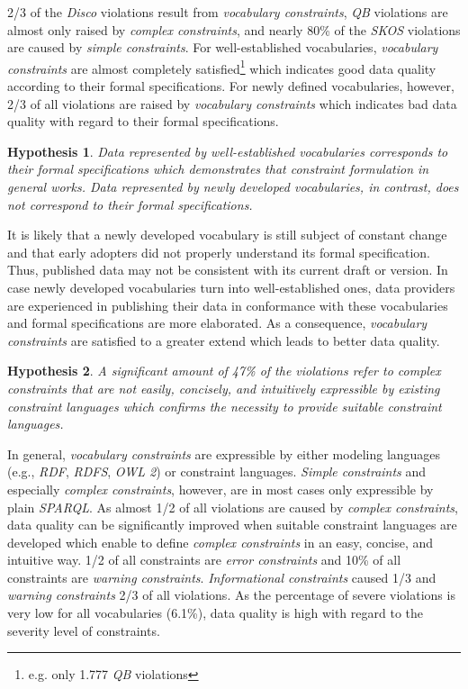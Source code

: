 \documentclass{llncs}
\newcommand{\tb}[1]{\todo[size=\small, color=green!40]{\textbf{Thomas:} #1}}
\newtheorem{hyp}{Hypothesis}
\begin{document}
2/3 of the \emph{Disco} violations result from \emph{vocabulary constraints},
\emph{QB} violations are almost only raised by \emph{complex constraints}, and 
nearly 80\% of the \emph{SKOS} violations are caused by \emph{simple constraints}.
For well-established vocabularies, \emph{vocabulary constraints} are almost completely satisfied\footnote{e.g. only 1.777 \emph{QB} violations} which indicates good data quality according to their formal specifications.
For newly defined vocabularies, however, 2/3 of all violations are raised by \emph{vocabulary constraints}
which indicates bad data quality with regard to their formal specifications.

\begin{hyp}
Data represented by well-established vocabularies corresponds to their formal specifications which demonstrates that constraint formulation in general works. 
Data represented by newly developed vocabularies, in contrast, does not correspond to their formal specifications.
\end{hyp}

It is likely that a newly developed vocabulary is still subject of constant change
and that early adopters did not properly understand its formal specification.
Thus, published data may not be consistent with its current draft or version.
In case newly developed vocabularies turn into well-established ones,
data providers are experienced in publishing their data in conformance with these vocabularies
and formal specifications are more elaborated. 
As a consequence, \emph{vocabulary constraints} are satisfied to a greater extend which leads to better data quality.  

\begin{hyp}
A significant amount of 47\% of the violations refer to complex constraints that are not easily, concisely, and intuitively expressible by existing constraint languages which confirms the necessity to provide suitable constraint languages.
\end{hyp} 

In general, \emph{vocabulary constraints} are expressible by either modeling languages (e.g., \emph{RDF}, \emph{RDFS}, \emph{OWL 2}) or constraint languages. 
\emph{Simple constraints} and especially \emph{complex constraints}, however, are in most cases only expressible by plain \emph{SPARQL}. 
As almost 1/2 of all violations are caused by \emph{complex constraints}, 
data quality can be significantly improved when suitable constraint languages are developed which enable to define \emph{complex constraints} in an easy, concise, and intuitive way.
1/2 of all constraints are \emph{error constraints} and
10\% of all constraints are \emph{warning constraints}.
\emph{Informational constraints} caused 1/3 and
\emph{warning constraints} 2/3 of all violations.
As the percentage of severe violations is very low for all vocabularies (6.1\%),
data quality is high with regard to the severity level of constraints.
\end{document}
